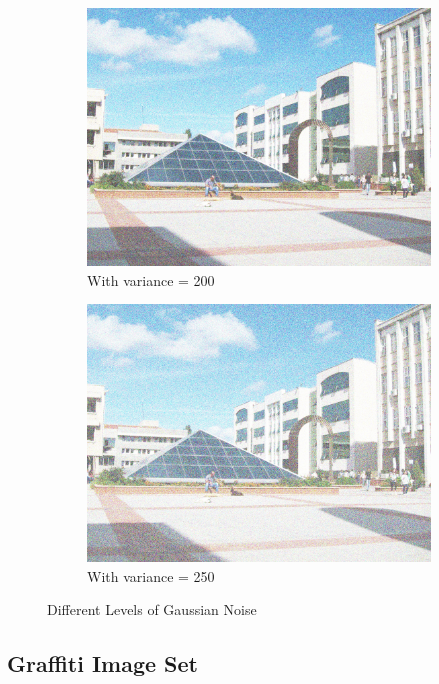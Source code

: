 \documentclass[12pt]{article}
\begin{document}
\begin{figure}[H]
\begin{subfigure}{0.45\textwidth}
        \centering
        \includegraphics[height=0.75\textwidth]{images/kuzey-var-200.jpg}
        \caption{With variance = 200}
        \label{noise-200}
    \end{subfigure}
    \begin{subfigure}{0.45\textwidth}
        \centering
        \includegraphics[height=0.75\textwidth]{images/kuzey-var-250.jpg}
        \caption{With variance = 250}
        \label{noise-250}
    \end{subfigure}
    \caption{Different Levels of Gaussian Noise}
    \label{fig:gaussian-noise}
\end{figure}

\subsection{Graffiti Image Set}
\end{document}
